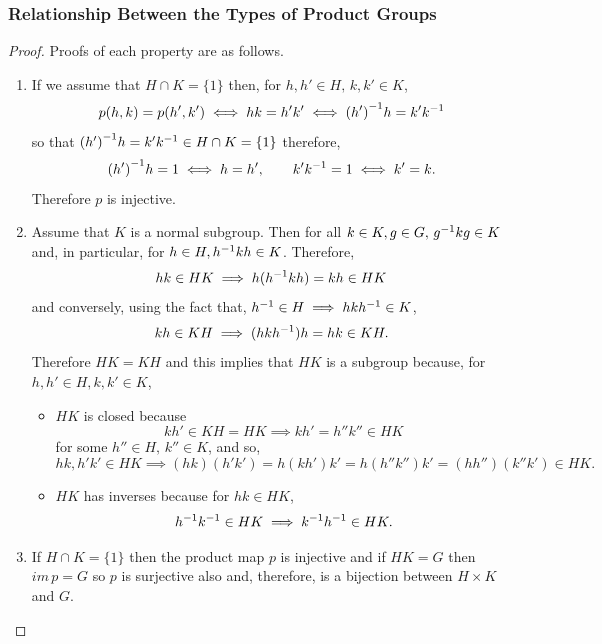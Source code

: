 \documentclass[MathsNotesBase.tex]{subfiles}
\begin{document}
{	\subsubsection{Relationship Between the Types of Product Groups}
	\medskip		
	\begin{proof}
		Proofs of each property are as follows.
		\begin{enumerate}[label=(\roman*)]
			\item{If we assume that ${ H \cap K = \{1\} }$ then, for ${ h,h' \in H,\, k,k' \in K }$,
				\[ p(h,k) = p(h', k') \iff hk = h'k' \iff {(h')}^{-1}h = k'{k}^{-1} \]
				so that ${ {(h')}^{-1}h = k'{k}^{-1} \in H \cap K = \{1\} }$ therefore,
				\[ {(h')}^{-1}h = 1 \iff h = h',\hspace{20pt} k'{k}^{-1} = 1 \iff k' = k. \]
				Therefore $p$ is injective.
			}
			\item{Assume \WLOG that $K$ is a normal subgroup. Then for all ${ k \in K,g \in G,\, {g}^{-1}kg \in K }$ and, in particular, for ${ h \in H, {h}^{-1}kh \in K }$. Therefore,
				\[  hk \in HK \implies h({h}^{-1}kh) = kh \in HK \]
				and conversely, using the fact that, ${ {h}^{-1} \in H \implies hk{h}^{-1} \in K }$,
				\[ kh \in KH \implies (hk{h}^{-1})h = hk \in KH. \]
				Therefore ${ HK = KH }$ and this implies that $HK$ is a subgroup because, for ${ h,h' \in H, k,k' \in K }$,
				\begin{itemize}
					\item{$HK$ is closed because
						\[ kh' \in KH = HK \implies kh' = h''k'' \in HK  \]
						for some ${ h'' \in H,\, k'' \in K }$, and so,
						\[ hk,h'k' \in HK \implies (hk)(h'k') = h(kh')k' = h(h''k'')k' = (hh'')(k''k') \in HK. \]
					}
					\item{$HK$ has inverses because for ${ hk \in HK }$,
						\[ {h}^{-1}{k}^{-1} \in HK \implies {k}^{-1}{h}^{-1} \in HK. \]
					}
				\end{itemize}
			}
			\item{If ${ H \cap K = \{1\} }$ then the product map $p$ is injective and if ${ HK = G }$ then ${ im\,p = G }$ so $p$ is surjective also and, therefore, is a bijection between ${ H \times K}$ and ${ G }$.\\
				
}
\end{enumerate}
\end{proof}}
\end{document}
